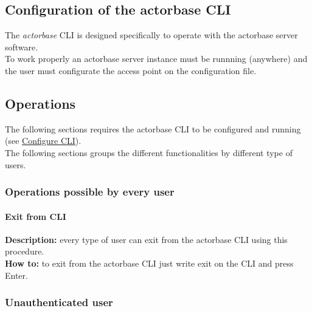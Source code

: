 \documentclass{scalatekids-article}
\begin{document}




\subsection{Configuration of the actorbase CLI}
\label{sec:configurationcli}
The \textit{actorbase} CLI is designed specifically to operate 
with the actorbase server software.\\
To work properly an actorbase server instance must be runnning 
(anywhere) and the user must configurate the access point on the configuration file.

\subsection{Operations}

The following sections requires the actorbase CLI to be configured and 
running (see \hyperref[sec:configurationcli]{Configure CLI}).\\
The following sections groups the different functionalities by different 
type of users.

\subsubsection{Operations possible by every user}
\label{sec:everyuser}
\paragraph{Exit from CLI}

\textbf{Description:} every type of user can exit from the actorbase CLI 
using this procedure.\\
\textbf{How to:} to exit from the actorbase CLI just write exit on the CLI and 
press Enter.

\subsubsection{Unauthenticated user}
\label{sec:unauthenticateduser}
\end{document}

